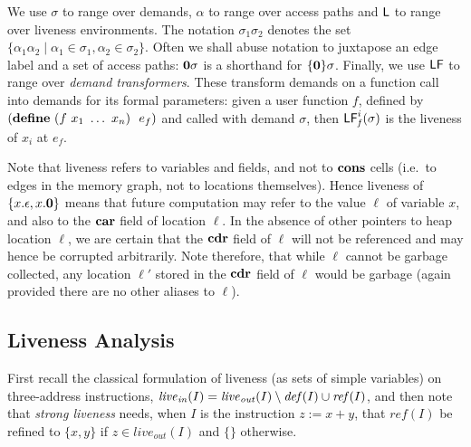 We use $\sigma$  to range over demands, $\alpha$  to range over access
paths  and $\mathsf{L}$  to range  over liveness  environments.  The notation
$\sigma_1\sigma_2$  denotes  the  set $\lbrace  \alpha_1\alpha_2  \mid
\alpha_1 \in  \sigma_1, \alpha_2 \in \sigma_2\rbrace$.  Often we shall
abuse notation to  juxtapose an edge label and a  set of access paths:
$\mathbf{0}\sigma$   is   a   shorthand  for   $\lbrace\mathbf{0}\rbrace\sigma$.
Finally,  we use $\mathsf{LF}$  to range  over {\em  demand transformers}.
These transform demands on a function call into demands for its formal
parameters:    given    a    user    function    $f$,    defined    by
$(\DEFINE\  (f\ x_1\  \ldots\ x_n)\  \  e_f)$ and  called with  demand
$\sigma$, then $\mathsf{LF}_{\mathit f}^{i}( {\mathit \sigma})$ is the liveness of $x_i$ at $e_f$.

Note that liveness refers to  variables and fields, and not to $\mbox{$\mathbf{cons}$}$
cells  (i.e.\  to  edges  in   the  memory  graph,  not  to  locations
themselves).   Hence liveness  of $\{x.\epsilon,x.\mathbf{0}\}$  means that
future computation may refer to  the value $\ell$ of variable $x$, and
also to the $\mbox{$\mathbf{car}$}$ field of  location $\ell$.  In the absence of other
pointers to heap location $\ell$, we are certain that the $\mbox{$\mathbf{cdr}$}$ field
of  $\ell$  will  not  be   referenced  and  may  hence  be  corrupted
arbitrarily.   Note therefore,  that  while $\ell$  cannot be  garbage
collected, any location  $\ell'$ stored in the $\mbox{$\mathbf{cdr}$}$  field of $\ell$
would  be  garbage (again  provided  there  are  no other  aliases  to
$\ell$).



\subsection{Liveness Analysis}
First recall the classical formulation of liveness (as sets of simple variables)
on three-address instructions,
$
\mathit{live}_\mathit{in}(I) = \mathit{live}_\mathit{out}(I)
     \setminus \mathit{def\/}(I)
     \cup   \mathit{ref\/}(I)
$,
and then note that {\em strong liveness} needs, when $I$ is the instruction $z:=x+y$,
that $\mathit{ref}(I)$ be refined to
$\{x,y\}$ if $z \in\mathit{live}_\mathit{out}(I)$ and $\{\}$ otherwise.

